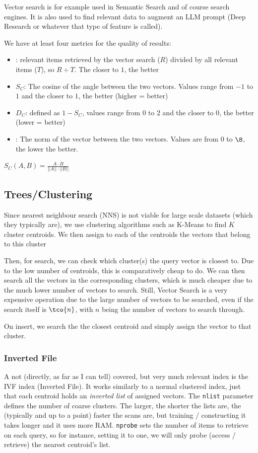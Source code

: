Vector search is for example used in Semantic Search and of course search engines.
It is also used to find relevant data to augment an LLM prompt (Deep Research or whatever that type of feature is called).

We have at least four metrics for the quality of results:
\begin{itemize}
    \item {}: relevant items retrieved by the vector search ($R$) divided by all relevant items ($T$), so $R \div T$. The closer to $1$, the better
    \item {} $S_C$: The cosine of the angle between the two vectors. Values range from $-1$ to $1$ and the closer to $1$, the better (higher = better)
    \item {} $D_C$: defined as $1 - S_C$, values range from $0$ to $2$ and the closer to $0$, the better (lower = better)
    \item {}: The norm of the vector between the two vectors. Values are from $0$ to $\8$, the lower the better.
\end{itemize}
$S_C(A, B) = \frac{A \cdot B}{||A|| \cdot ||B||}$


\subsection{Trees/Clustering}
Since nearest neighbour search (NNS) is not viable for large scale datasets (which they typically are),
we use clustering algorithms such as K-Means to find $K$ cluster centroids.
We then assign to each of the centroids the vectors that belong to this cluster

Then, for search, we can check which cluster(s) the query vector is closest to.
Due to the low number of centroids, this is comparatively cheap to do.
We can then search all the vectors in the corresponding clusters, which is much cheaper due to the much lower number of vectors to search.
Still, Vector Search is a very expensive operation due to the large number of vectors to be searched, even if the search itself is $\tco{n}$,
with $n$ being the number of vectors to search through.

On insert, we search the the closest centroid and simply assign the vector to that cluster.

\subsubsection{Inverted File}
A not (directly, as far as I can tell) covered, but very much relevant index is the IVF index (Inverted File).
It works similarly to a normal clustered index, just that each centroid holds an \textit{inverted list} of assigned vectors.
The \texttt{nlist} parameter defines the number of coarse clusters. The larger, the shorter the lists are, the (typically and up to a point) faster the scans are,
but training / constructing it takes longer and it uses more RAM.
\texttt{nprobe} sets the number of items to retrieve on each query, so for instance, setting it to one,
we will only probe (access / retrieve) the nearest centroid's list.
